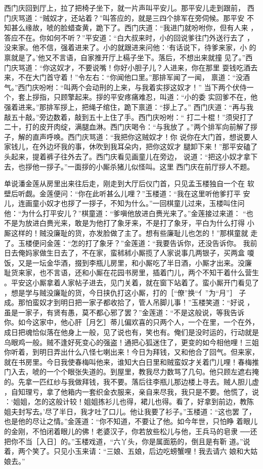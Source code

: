 西门庆回到厅上，拉了把椅子坐下，就一片声叫平安儿。那平安儿走到跟前，
西门庆骂道：“贼奴才，还站着？”叫答应的，就是三四个排军在旁伺候。那平安
不知甚么缘故，唬的脸蜡查黄，跪下了。西门庆道：“我进门就吩咐你，但有人来
，答应不在。你如何不听？”平安道：“白大叔来时，小的回说爹往门外送行去了
，没来家。他不信，强着进来了。小的就跟进来问他：‘有话说下，待爹来家，小
的禀就是了。’他又不言语，自家推开厅上槅子坐下。落后，不想出来就撞
见了。”西门庆骂道：“你这奴才，不要说嘴！你好小胆子儿？人进来，你在那里
耍钱吃酒去来，不在大门首守着！”令左右：“你闻他口里。”那排军闻了一闻，
禀道：“没酒气。”西门庆吩咐：“叫两个会动刑的上来，与我着实拶这奴才！”
当下两个伏侍一个，套上拶指，只顾擎起来。拶的平安疼痛难忍，叫道：“小的委
实回爹不在，他强着进来。”那排军拶上，把绳子绾住，跪下禀道：“拶上了。”
西门庆道：“再与我敲五十敲。”旁边数着，敲到五十上住了手。西门庆吩咐：“
打二十棍！”须臾打了二十，打的皮开肉绽，满腿血淋。西门庆喝令：“与我放了
。”两个排军向前解了拶子，解的直声呼唤。西门庆骂道：“我把你这贼奴才！你
说你在大门首，想说要人家钱儿，在外边坏我的事，休吹到我耳朵内，把你这奴才
腿卸下来！”那平安磕了头起来，提着裤子往外去了。西门庆看见画童儿在旁边，
说道：“把这小奴才拿下去，也拶他一拶子。”一面拶的小厮杀猪儿似怪叫。这里
西门庆在前厅拶人不题。

单说潘金莲从房里出来往后走，刚走到大厅后仪门首，只见孟玉楼独自一个在
软壁后听觑。金莲便问：“你在此听甚么儿哩？”玉楼道：“我在这里听他爹打平
安儿，连画童小奴才也拶了一拶子，不知为什么。”一回棋童儿过来，玉楼叫住问
他：“为什么打平安儿？”棋童道：“爹嗔他放进白赉光来了。”金莲接过来道：
“也不是为放进白赉光来，敢是为他打了象牙来，不是打了象牙，平白为什么打得
小厮这样的！贼没廉耻的货，亦发脸做了主了。想有些廉耻儿也怎的！”那棋童就
走了。玉楼便问金莲：“怎的打了象牙？”金莲道：“我要告诉你，还没告诉你。
我前日去俺妈家做生日去了，不在家，蛮秫秫小厮揽了人家说事几两银子，买两盒
嗄饭，又是一坛金华酒，掇到李瓶儿房里，和小厮吃了半日酒，小厮才出来。没廉
耻货来家，也不言语，还和小厮在花园书房里，插着门儿，两个不知干着什么营生
。平安这小厮拿着人家帖子进去，见门关着，就在窗下站着了。蛮小厮开门看见了
，想是学与贼没廉耻的货，今日挟仇打这小厮，打的［“僚”换“亻”为“月”］
子成。那怕蛮奴才到明日把一家子都收拾了，管人吊脚儿事！”玉楼笑道：“好说
，虽是一家子，有贤有愚，莫不都心邪了罢？”金莲道：“不是这般说，等我告诉
你。如今这家中，他心肝［月乞］蒂儿偏欢喜的只两个人，一个在里，一个在外，
成日把魂恰似落在他身上一般，见了说也有，笑也有。俺们是没时运的，行动就是
乌眼鸡一般。贼不逢好死变心的强盗！通把心狐迷住了，更变的如今相他哩！三姐
你听着，到明日弄出什么八怪七喇出来！今日为拜钱，又和他合了回气。但来家，
就在书房里。今日我使春梅叫他来，谁知大白日里和贼蛮奴才关着门儿哩！春梅推
门入去，唬的一个个眼张失道的。到屋里，教我尽力数骂了几句。他只顾左遮右掩
的。先拿一匹红纱与我做拜钱，我不要。落后往李瓶儿那边楼上寻去。贼人胆儿虚
，自知理亏，拿了他箱内一套织金衣服来，亲自来尽我，我只是不要。他慌了，说
：‘姐姐，怎的这般计较！姐姐拣衫儿也得，裙儿也得。看了，好拿到前边，教陈
姐夫封写去。’尽了半日，我才吐了口儿。他让我要了衫子。”玉楼道：“这也罢
了，也是他的尽让之情。”金莲道：“你不知道，不要让了他。如今年世，只怕睁
着眼儿的金刚，不怕闭着眼儿的佛！老婆汉子，你若放些松儿与他，王兵马的皂隶
──还把你不当［入日］的。”玉楼戏道，“六丫头，你是属面筋的，倒且是有靳
道。”说着，两个笑了。只见小玉来请：“三娘、五娘，后边吃螃蟹哩！我去请六
娘和大姑娘去。”

